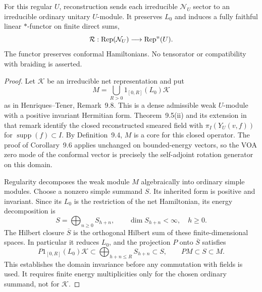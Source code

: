 \begin{proposition}
\label{clm:analytic-reconstruction}
For this regular $U$, reconstruction sends each irreducible
$\mathcal N_U$ sector to an irreducible ordinary unitary $U$-module.
It preserves $L_0$ and induces a fully faithful linear $*$-functor on
finite direct sums,
\[
 \mathcal R:\operatorname{Rep}(\mathcal N_U)\longrightarrow\operatorname{Rep}^{u}(U).
\]
The functor preserves conformal Hamiltonians.  No tensorator or
compatibility with braiding is asserted.
\end{proposition}
\begin{proof}
Let $\mathcal K$ be an irreducible net representation and put
\[
 M=\bigcup_{R>0}1_{[0,R]}(L_0)\mathcal K
\]
as in Henriques--Tener, Remark~9.8.  This is a dense admissible weak
$U$-module with a positive invariant Hermitian form.  Theorem~9.5(ii)
and its extension in that remark identify the closed reconstructed
smeared field with $\pi_I(Y_U(v,f))$ for
$\operatorname{supp}(f)\subset I$.  By Definition~9.4, $M$ is a
core for this closed operator.  The proof of Corollary~9.6 applies
unchanged on bounded-energy vectors, so the VOA zero mode of the
conformal vector is precisely the self-adjoint rotation generator on
this domain.

Regularity decomposes the weak module $M$ algebraically into ordinary
simple modules.  Choose a nonzero simple summand $S$.  Its inherited
form is positive and invariant.  Since its $L_0$ is the restriction
of the net Hamiltonian, its energy decomposition is
\[
 S=\bigoplus_{n\geq0}S_{h+n},\qquad
 \dim S_{h+n}<\infty,\quad h\geq0.
\]
The Hilbert closure $\overline S$ is the orthogonal Hilbert sum of
these finite-dimensional spaces.  In particular it reduces $L_0$,
and the projection $P$ onto $\overline S$ satisfies
\begin{equation}
 P1_{[0,R]}(L_0)\mathcal K
   \subset\bigoplus_{h+n\leq R}S_{h+n}\subset S,
 \qquad PM\subset S\subset M.
 \label{eq:analytic-projection-core}
\end{equation}
This establishes the domain invariance before any commutation with
fields is used.  It requires finite energy multiplicities only for the
chosen ordinary summand, not for $\mathcal K$.


\end{proof}
